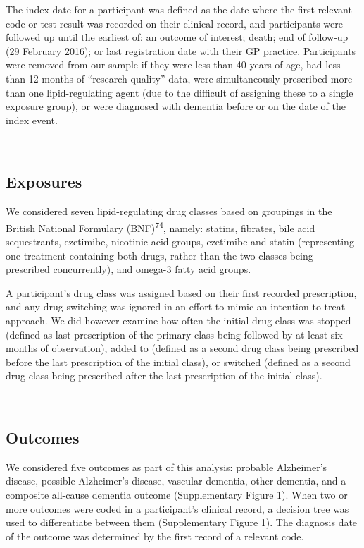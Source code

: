 \documentclass[a4paper, twoside]{templates/ociamthesis}
\begin{document}
The index date for a participant was defined as the date where the first relevant code or test result was recorded on their clinical record, and participants were followed up until the earliest of: an outcome of interest; death; end of follow-up (29 February 2016); or last registration date with their GP practice. Participants were removed from our sample if they were less than 40 years of age, had less than 12 months of ``research quality'' data, were simultaneously prescribed more than one lipid-regulating agent (due to the difficult of assigning these to a single exposure group), or were diagnosed with dementia before or on the date of the index event.

~

\hypertarget{exposures}{%
\subsection{Exposures}\label{exposures}}

We considered seven lipid-regulating drug classes based on groupings in the British National Formulary (BNF)\textsuperscript{\protect\hyperlink{ref-wishart2017}{74}}, namely: statins, fibrates, bile acid sequestrants, ezetimibe, nicotinic acid groups, ezetimibe and statin (representing one treatment containing both drugs, rather than the two classes being prescribed concurrently), and omega-3 fatty acid groups.

A participant's drug class was assigned based on their first recorded prescription, and any drug switching was ignored in an effort to mimic an intention-to-treat approach. We did however examine how often the initial drug class was stopped (defined as last prescription of the primary class being followed by at least six months of observation), added to (defined as a second drug class being prescribed before the last prescription of the initial class), or switched (defined as a second drug class being prescribed after the last prescription of the initial class).

~

\hypertarget{outcomes}{%
\subsection{Outcomes}\label{outcomes}}

We considered five outcomes as part of this analysis: probable Alzheimer's disease, possible Alzheimer's disease, vascular dementia, other dementia, and a composite all-cause dementia outcome (Supplementary Figure 1). When two or more outcomes were coded in a participant's clinical record, a decision tree was used to differentiate between them (Supplementary Figure 1). The diagnosis date of the outcome was determined by the first record of a relevant code.
\end{document}
